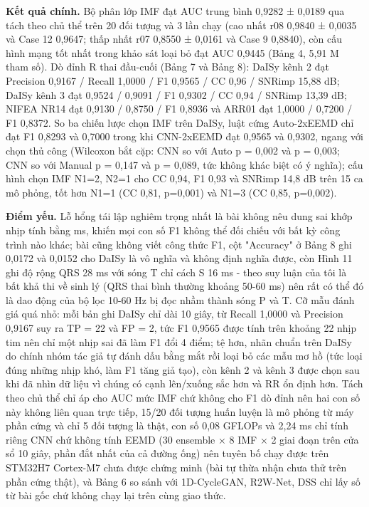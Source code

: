 \documentclass[12pt,a4paper]{article}
\begin{document}
\noindent \textbf{Kết quả chính.} Bộ phân lớp IMF đạt AUC trung bình 0,9282 ± 0,0189 qua tách theo chủ thể trên 20 đối tượng và 3 lần chạy (cao nhất r08 0,9840 ± 0,0035 và Case 12 0,9647; thấp nhất r07 0,8550 ± 0,0161 và Case 9 0,8840), còn cấu hình mạng tốt nhất trong khảo sát loại bỏ đạt AUC 0,9445 (Bảng 4, 5,91 M tham số). Dò đỉnh R thai đầu-cuối (Bảng 7 và Bảng 8): DaISy kênh 2 đạt Precision 0,9167 / Recall 1,0000 / F1 0,9565 / CC 0,96 / SNRimp 15,88 dB; DaISy kênh 3 đạt 0,9524 / 0,9091 / F1 0,9302 / CC 0,94 / SNRimp 13,39 dB; NIFEA NR14 đạt 0,9130 / 0,8750 / F1 0,8936 và ARR01 đạt 1,0000 / 0,7200 / F1 0,8372. So ba chiến lược chọn IMF trên DaISy, luật cứng Auto-2xEEMD chỉ đạt F1 0,8293 và 0,7000 trong khi CNN-2xEEMD đạt 0,9565 và 0,9302, ngang với chọn thủ công (Wilcoxon bắt cặp: CNN so với Auto p = 0,002 và p = 0,003; CNN so với Manual p = 0,147 và p = 0,089, tức không khác biệt có ý nghĩa); cấu hình chọn IMF N1=2, N2=1 cho CC 0,94, F1 0,93 và SNRimp 14,8 dB trên 15 ca mô phỏng, tốt hơn N1=1 (CC 0,81, p=0,001) và N1=3 (CC 0,85, p=0,002).\par\vspace{3pt}
\noindent \textbf{Điểm yếu.} Lỗ hổng tái lập nghiêm trọng nhất là bài không nêu dung sai khớp nhịp tính bằng ms, khiến mọi con số F1 không thể đối chiếu với bất kỳ công trình nào khác; bài cũng không viết công thức F1, cột "Accuracy" ở Bảng 8 ghi 0,0172 và 0,0152 cho DaISy là vô nghĩa và không định nghĩa được, còn Hình 11 ghi độ rộng QRS 28 ms với sóng T chỉ cách S 16 ms - theo suy luận của tôi là bất khả thi về sinh lý (QRS thai bình thường khoảng 50-60 ms) nên rất có thể đó là dao động của bộ lọc 10-60 Hz bị đọc nhầm thành sóng P và T. Cỡ mẫu đánh giá quá nhỏ: mỗi bản ghi DaISy chỉ dài 10 giây, từ Recall 1,0000 và Precision 0,9167 suy ra TP = 22 và FP = 2, tức F1 0,9565 được tính trên khoảng 22 nhịp tim nên chỉ một nhịp sai đã làm F1 đổi 4 điểm; tệ hơn, nhãn chuẩn trên DaISy do chính nhóm tác giả tự đánh dấu bằng mắt rồi loại bỏ các mẫu mơ hồ (tức loại đúng những nhịp khó, làm F1 tăng giả tạo), còn kênh 2 và kênh 3 được chọn sau khi đã nhìn dữ liệu vì chúng có cạnh lên/xuống sắc hơn và RR ổn định hơn. Tách theo chủ thể chỉ áp cho AUC mức IMF chứ không cho F1 dò đỉnh nên hai con số này không liên quan trực tiếp, 15/20 đối tượng huấn luyện là mô phỏng từ máy phần cứng và chỉ 5 đối tượng là thật, con số 0,08 GFLOPs và 2,24 ms chỉ tính riêng CNN chứ không tính EEMD (30 ensemble × 8 IMF × 2 giai đoạn trên cửa sổ 10 giây, phần đắt nhất của cả đường ống) nên tuyên bố chạy được trên STM32H7 Cortex-M7 chưa được chứng minh (bài tự thừa nhận chưa thử trên phần cứng thật), và Bảng 6 so sánh với 1D-CycleGAN, R2W-Net, DSS chỉ lấy số từ bài gốc chứ không chạy lại trên cùng giao thức.\par\vspace{3pt}
\end{document}
